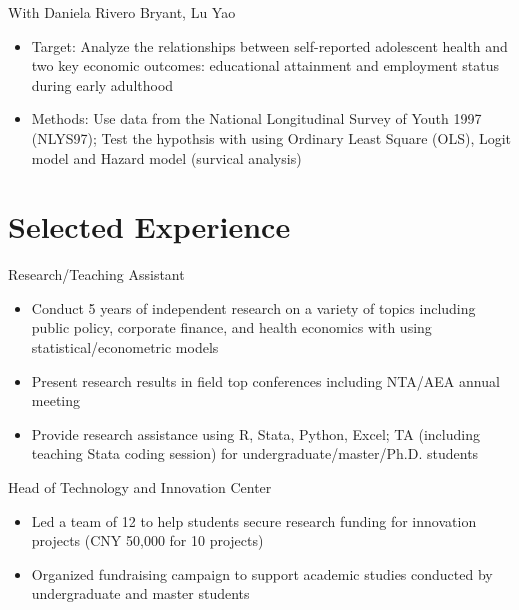 \documentclass{resume}
\begin{document}
With Daniela Rivero Bryant, Lu Yao
\begin{itemize}
  \item Target: Analyze the relationships between self-reported adolescent health and two key economic outcomes: educational attainment and employment status during early adulthood
  \item Methods: Use data from the National Longitudinal Survey of Youth 1997 (NLYS97); Test the hypothsis with using Ordinary Least Square (OLS), Logit model and Hazard model (survical analysis)
  \end{itemize}

\section{Selected Experience}
Research/Teaching Assistant
\begin{itemize}
  \item Conduct 5 years of independent research on a variety of topics including public policy, corporate finance, and health economics with using statistical/econometric models
  \item Present research results in field top conferences including NTA/AEA annual meeting
  \item Provide research assistance using R, Stata, Python, Excel; TA (including teaching Stata coding session) for undergraduate/master/Ph.D. students
\end{itemize}


Head of Technology and Innovation Center
\begin{itemize}
  \item Led a team of 12 to help students secure research funding for innovation projects (CNY 50,000 for 10 projects)
  \item Organized fundraising campaign to support academic studies conducted by undergraduate and master students
\end{itemize}
\end{document}
